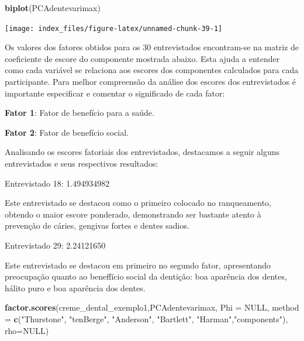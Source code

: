 \documentclass[12pt,brazil,oneside]{book}
\newenvironment{Shaded}{\begin{snugshade}}{\end{snugshade}}
\newcommand{\DataTypeTok}[1]{\textcolor[rgb]{0.13,0.29,0.53}{#1}}
\newcommand{\KeywordTok}[1]{\textcolor[rgb]{0.13,0.29,0.53}{\textbf{#1}}}
\newcommand{\NormalTok}[1]{#1}
\newcommand{\OtherTok}[1]{\textcolor[rgb]{0.56,0.35,0.01}{#1}}
\newcommand{\StringTok}[1]{\textcolor[rgb]{0.31,0.60,0.02}{#1}}
\begin{document}
\begin{Shaded}
\begin{Highlighting}[]
\KeywordTok{biplot}\NormalTok{(PCAdentevarimax)}
\end{Highlighting}
\end{Shaded}

\begin{center}\texttt{[image: index\_files/figure-latex/unnamed-chunk-39-1]} \end{center}

Os valores dos fatores obtidos para os 30 entrevistados encontram-se na matriz de coeficiente de escore do componente mostrada abaixo. Esta ajuda a entender como cada variável se relaciona aos escores dos componentes calculados para cada participante. Para melhor compreensão da análise dos escores dos entrevistados é importante especificar e comentar o significado de cada fator:

\textbf{Fator 1}: Fator de benefício para a saúde.

\textbf{Fator 2}: Fator de benefício social.

Analisando os escores fatoriais dos entrevistados, destacamos a seguir alguns entrevistados e seus respectivos resultados:

Entrevistado 18: 1.494934982

Este entrevistado se destacou como o primeiro colocado no ranqueamento, obtendo o maior escore ponderado, demonstrando ser bastante atento à prevenção de cáries, gengivas fortes e dentes sadios.

Entrevistado 29: 2.24121650

Este entrevistado se destacou em primeiro no segundo fator, apresentando preocupação quanto ao beneffício social da dentição: boa aparência dos dentes, hálito puro e boa aparência dos dentes.

\begin{Shaded}
\begin{Highlighting}[]
\KeywordTok{factor.scores}\NormalTok{(creme_dental_exemplo1,PCAdentevarimax, }
              \DataTypeTok{Phi =} \OtherTok{NULL}\NormalTok{, }
              \DataTypeTok{method =} \KeywordTok{c}\NormalTok{(}\StringTok{"Thurstone"}\NormalTok{, }\StringTok{"tenBerge"}\NormalTok{, }\StringTok{"Anderson"}\NormalTok{,}
                         \StringTok{"Bartlett"}\NormalTok{, }\StringTok{"Harman"}\NormalTok{,}\StringTok{"components"}\NormalTok{),}
              \DataTypeTok{rho=}\OtherTok{NULL}\NormalTok{)}
\end{Highlighting}
\end{Shaded}
\end{document}

